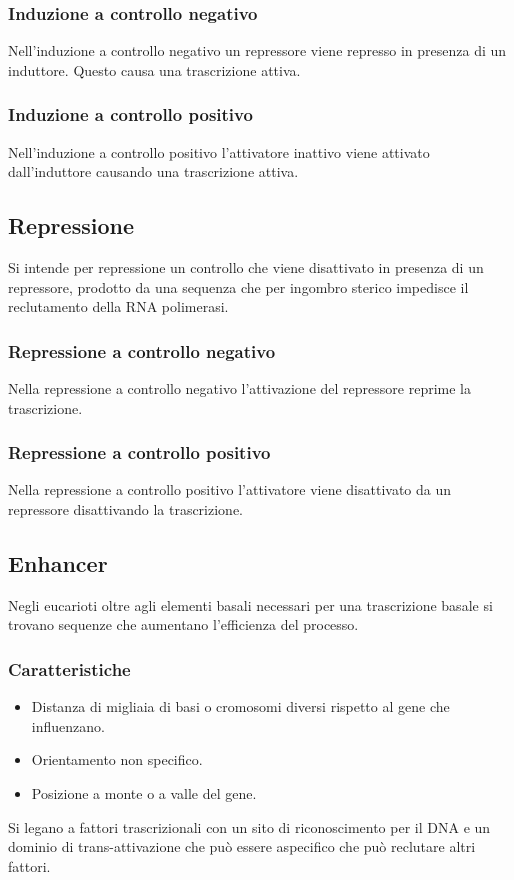 		\subsubsection{Induzione a controllo negativo}
		Nell'induzione a controllo negativo un repressore viene represso in presenza di  un induttore.
		Questo causa una trascrizione attiva.

		\subsubsection{Induzione a controllo positivo}
		Nell'induzione a controllo positivo l'attivatore inattivo viene attivato dall'induttore causando una trascrizione attiva.

	\subsection{Repressione}
	Si intende per repressione un controllo che viene disattivato in presenza di un repressore, prodotto da una sequenza che per ingombro sterico impedisce il reclutamento della RNA polimerasi.

		\subsubsection{Repressione a controllo negativo}
		Nella repressione a controllo negativo l'attivazione del repressore reprime la trascrizione.

		\subsubsection{Repressione a controllo positivo}
		Nella repressione a controllo positivo l'attivatore viene disattivato da un repressore disattivando la trascrizione.

	\subsection{Enhancer}
	Negli eucarioti oltre agli elementi basali necessari per una trascrizione basale si trovano sequenze che aumentano l'efficienza del processo.

		\subsubsection{Caratteristiche}
		\begin{multicols}{2}
			\begin{itemize}
				\item Distanza di migliaia di basi o cromosomi diversi rispetto al gene che influenzano.
				\item Orientamento non specifico.
				\item Posizione a monte o a valle del gene.
			\end{itemize}
		\end{multicols}
		Si legano a fattori trascrizionali con un sito di riconoscimento per il DNA e un dominio di trans-attivazione che pu\`o essere aspecifico che pu\`o reclutare altri fattori.


